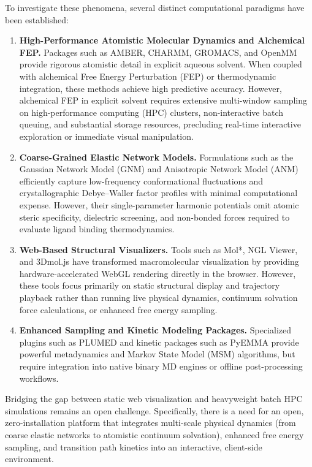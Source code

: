 \documentclass[journal=jpcbfk,manuscript=article]{achemso}
\begin{document}
To investigate these phenomena, several distinct computational paradigms have been established:
\begin{enumerate}
\item \textbf{High-Performance Atomistic Molecular Dynamics and Alchemical FEP.} Packages such as AMBER,\cite{case2005amber} CHARMM,\cite{brooks1983charmm} GROMACS,\cite{abraham2015gromacs} and OpenMM\cite{eastman2017openmm} provide rigorous atomistic detail in explicit aqueous solvent. When coupled with alchemical Free Energy Perturbation (FEP) or thermodynamic integration,\cite{boresch2003absolute,mobley2017predicting} these methods achieve high predictive accuracy. However, alchemical FEP in explicit solvent requires extensive multi-window sampling on high-performance computing (HPC) clusters, non-interactive batch queuing, and substantial storage resources, precluding real-time interactive exploration or immediate visual manipulation.
\item \textbf{Coarse-Grained Elastic Network Models.} Formulations such as the Gaussian Network Model (GNM) and Anisotropic Network Model (ANM)\cite{bahar1997vibrational,atilgan2001anisotropy} efficiently capture low-frequency conformational fluctuations and crystallographic Debye--Waller factor profiles with minimal computational expense. However, their single-parameter harmonic potentials omit atomic steric specificity, dielectric screening, and non-bonded forces required to evaluate ligand binding thermodynamics.\cite{mobley2007predicting}
\item \textbf{Web-Based Structural Visualizers.} Tools such as Mol*,\cite{sehnal2021molstar} NGL Viewer,\cite{rose2018ngl} and 3Dmol.js\cite{rego20153dmol} have transformed macromolecular visualization by providing hardware-accelerated WebGL rendering directly in the browser. However, these tools focus primarily on static structural display and trajectory playback rather than running live physical dynamics, continuum solvation force calculations, or enhanced free energy sampling.
\item \textbf{Enhanced Sampling and Kinetic Modeling Packages.} Specialized plugins such as PLUMED\cite{tribello2014plumed} and kinetic packages such as PyEMMA\cite{prinz2011markov,noe2009constructing} provide powerful metadynamics and Markov State Model (MSM) algorithms, but require integration into native binary MD engines or offline post-processing workflows.
\end{enumerate}

Bridging the gap between static web visualization and heavyweight batch HPC simulations remains an open challenge. Specifically, there is a need for an open, zero-installation platform that integrates multi-scale physical dynamics (from coarse elastic networks to atomistic continuum solvation), enhanced free energy sampling, and transition path kinetics into an interactive, client-side environment.
\end{document}
